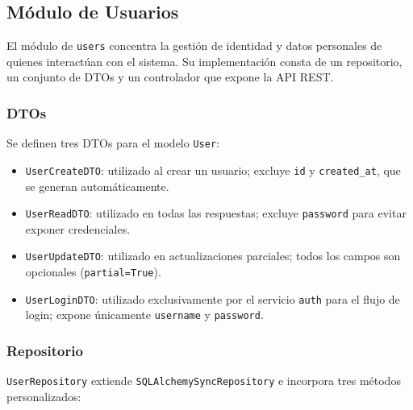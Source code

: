 \subsection{Módulo de Usuarios}\label{sec:backend_usuarios}

El módulo de \texttt{users} concentra la gestión de identidad y datos personales de quienes interactúan con el sistema. Su implementación consta de un repositorio, un conjunto de DTOs y un controlador que expone la API REST.

\subsubsection*{DTOs}

Se definen tres DTOs para el modelo \texttt{User}:

\begin{itemize}
	\item \texttt{UserCreateDTO}: utilizado al crear un usuario; excluye \texttt{id} y \texttt{created\_at}, que se generan automáticamente.
	\item \texttt{UserReadDTO}: utilizado en todas las respuestas; excluye \texttt{password} para evitar exponer credenciales.
	\item \texttt{UserUpdateDTO}: utilizado en actualizaciones parciales; todos los campos son opcionales (\texttt{partial=True}).
	\item \texttt{UserLoginDTO}: utilizado exclusivamente por el servicio \texttt{auth} para el flujo de login; expone únicamente \texttt{username} y \texttt{password}.
\end{itemize}

\subsubsection*{Repositorio}

\texttt{UserRepository} extiende \texttt{SQLAlchemySyncRepository} e incorpora tres métodos personalizados:

